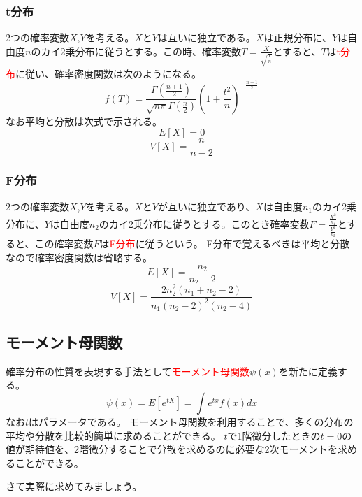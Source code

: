 \documentclass[a4paper,10pt]{jarticle}
\begin{document}
\subsubsection{t分布}
2つの確率変数$X$,$Y$を考える。$X$と$Y$は互いに独立である。$X$は正規分布に、$Y$は自由度$n$のカイ2乗分布に従うとする。この時、確率変数$T=\frac{X}{\sqrt{\frac{Y}{n}}}$とすると、$T$は\textcolor{red}{t分布}に従い、確率密度関数は次のようになる。
\begin{equation}
    f(T) =\frac{\Gamma(\frac{n+1}{2})}{\sqrt{n\pi}\Gamma(\frac{n}{2})}(1+\frac{t^2}{n})^{-\frac{n+1}{2}}\tag{3,29}
\end{equation}
なお平均と分散は次式で示される。
\begin{equation}
    E[X] =  0\tag{3,30}
\end{equation}
\begin{equation}
    V[X] = \frac{n}{n-2}\tag{3,31}
\end{equation}
\subsubsection{F分布}
2つの確率変数$X$,$Y$を考える。$X$と$Y$が互いに独立であり、$X$は自由度$n_1$のカイ2乗分布に、$Y$は自由度$n_2$のカイ2乗分布に従うとする。このとき確率変数$F=\frac{\frac{X^2}{n_1}}{\frac{Y^2}{n_2}}$とすると、この確率変数$F$は\textcolor{red}{F分布}に従うという。
F分布で覚えるべきは平均と分散なので確率密度関数は省略する。
\begin{equation}
    E[X] = \frac{n_2}{n_2-2}\tag{3,32}
\end{equation}
\begin{equation}
    V[X] = \frac{2n_2^2(n_1+n_2-2)}{n_1(n_2-2)^2(n_2-4)}\tag{3,33}
\end{equation}

\subsection{モーメント母関数}
確率分布の性質を表現する手法として\textcolor{red}{モーメント母関数}$\psi(x)$を新たに定義する。
\begin{equation}
    \psi(x) = E[e^{tX}] = \int e^{tx}f(x)dx\tag{3,34}
\end{equation}
なお$t$はパラメータである。
モーメント母関数を利用することで、多くの分布の平均や分散を比較的簡単に求めることができる。
$t$で1階微分したときの$t=0$の値が期待値を、2階微分することで分散を求めるのに必要な2次モーメントを求めることができる。

さて実際に求めてみましょう。
\end{document}
